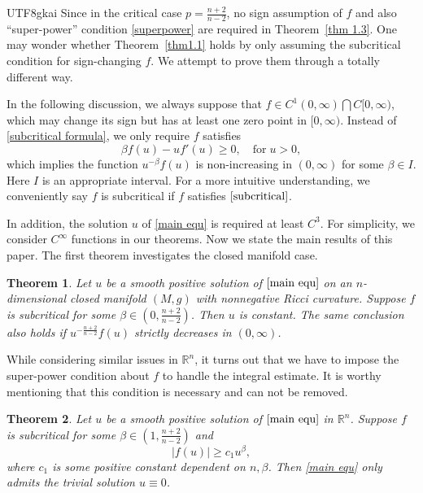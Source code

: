 \documentclass[reqno,12pt]{amsart}
\newcommand{\text}{\mbox}
\numberwithin{equation}{section}
\newtheorem{thm}{Theorem}[section]
\newcommand{\thmref}[1]{Theorem~\ref{#1}}
\newcommand{\bR}{{\mathbb R}}  %
\begin{document}
\begin{CJK}{UTF8}{gkai}
		     Since in the critical case $p=\frac{n+2}{n-2}$, no sign assumption of $f$ and also ``super-power'' condition \eqref{superpower}  are required in \thmref{thm 1.3}. One may wonder whether  \thmref{thm1.1} holds by only assuming the subcritical condition for sign-changing $f$.  We attempt to prove them through a
		    totally different way.
		  
		  	In the following discussion, we always suppose that $f\in C^{1}(0,\infty)\bigcap C[0,\infty)$, which may change its sign but has at least one  zero point in $[0,\infty)$. Instead of \eqref{subcritical formula},  we only require $f$ satisfies
		  	\begin{equation}\label{subcritical}
		  		\beta f(u)-uf'(u)\ge 0, \quad \text{for}\;u>0,
		  	\end{equation}
		  	  which implies the function $u^{-\beta} f(u)$ is non-increasing in $(0,\infty)$ for some $\beta\in I$. Here $I$ is an 
		  	  appropriate interval.  For a more intuitive understanding, we conveniently say $f$ is subcritical if $f$ satisfies $\eqref{subcritical}$.
		  	  
		  	  In addition, the solution $u$ of \eqref{main equ} is required at least $C^{3}$. For simplicity, we consider $C^{\infty}$ functions in our theorems. Now we state the main results of this paper. The first theorem investigates the  closed manifold case.
		  	
		  	\begin{thm}\label{mainthm1}
		  		Let $u$ be a smooth positive solution of $\eqref{main equ}$  on an $n$-dimensional closed  manifold $(M,g)$ with nonnegative Ricci curvature. Suppose  $f$ is subcritical for some $\beta\in (0,\frac{n+2}{n-2})$. Then $u$ is constant. The same conclusion also holds if $u^{-\frac{n+2}{n-2}} f(u)$  strictly decreases in $(0,\infty)$.
		  	\end{thm}
		  	
		  	 While considering similar issues in $\bR^{n}$, it turns out that we have to impose the super-power condition about $f$ to handle the integral estimate. It is worthy mentioning that this condition is necessary and can not be removed. 
		  	 
		  	 \begin{thm}\label{mainthm2}
		  	 		Let $u$ be a smooth positive solution of $\eqref{main equ}$ in $\bR^{n}$. Suppose $f$ is subcritical for some $\beta\in (1,\frac{n+2}{n-2})$ and 
		  	 		\begin{equation}\label{condition of mainthm2}
		  	 			|f(u)|\ge c_{1}u^{\beta},
		  	 		\end{equation}
		  	 		where $c_{1}$ is some positive constant dependent on $n,\beta$. Then \eqref{main equ} only admits the trivial solution $u\equiv 0$.
		  	 \end{thm}
		  	

\end{CJK}
\end{document}
